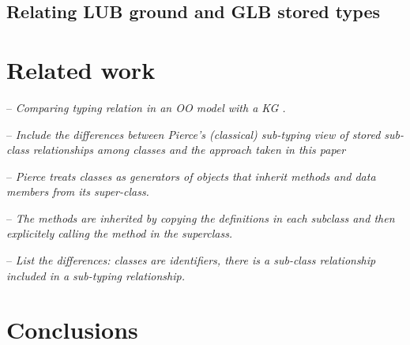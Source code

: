 \documentclass[runningheads]{llncs}
\newcommand{\notes}[1]{\noindent\begin{small}-- \emph{#1}\\\end{small}}
\begin{document}



\subsection{Relating LUB ground and GLB stored types}






\section{Related work}

\notes{Comparing typing relation in an OO model with a KG \cite{Pierce2002}.}
\notes{Include the differences between Pierce's (classical) sub-typing view of stored sub-class relationships among classes and the approach taken in this paper}
\notes{Pierce treats classes as generators of objects that inherit methods and data members from its super-class.}
\notes{The methods are inherited by copying the definitions in each subclass and then explicitely calling the method in the superclass.}
\notes{List the differences: classes are identifiers, there is a sub-class relationship included in a sub-typing relationship.}






\section{Conclusions}



%



\end{document}
